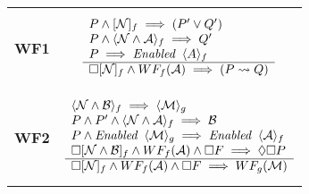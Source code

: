 \vspace{0.25cm}
\begin{tabular}{ll}
    \textbf{WF1} & 
    \begin{minipage}{0.5\linewidth}
    \begin{equation*}
    \begin{array}{l}
        P \land [\mathcal{N}]_f \implies (P' \lor Q') \\
        P \land \langle \mathcal{N} \land \mathcal{A} \rangle_f \implies Q' \\
        P \implies \textit{Enabled} \hspace{0.2cm} \langle A \rangle_f \\
        \hline
        \Box[\mathcal{N}]_f \land WF_f(\mathcal{A}) \implies (P \leadsto Q)
    \end{array}
    \end{equation*}
    \end{minipage} \\[10pt]
    \textbf{WF2} & 
    \begin{minipage}{0.5\linewidth}
    \begin{equation*}
    \begin{array}{l}
        \langle \mathcal{N} \land \mathcal{B} \rangle_f \implies \langle \mathcal{M} \rangle_g \\
        P \land P' \land \langle \mathcal{N} \land \mathcal{A} \rangle_f \implies \mathcal{B} \\
        P \land \textit{Enabled} \hspace{0.2cm} \langle \mathcal{M} \rangle_g \implies \textit{Enabled} \hspace{0.2cm} \langle \mathcal{A} \rangle_f \\
        \Box [\mathcal{N} \land \mathcal{B}]_f \land WF_f(\mathcal{A}) \land \Box F \implies \Diamond \Box P \\
        \hline
        \Box[\mathcal{N}]_f \land WF_f(\mathcal{A}) \land \Box F \implies WF_g(\mathcal{M})
    \end{array}
    \end{equation*}
    \end{minipage}
\end{tabular}

